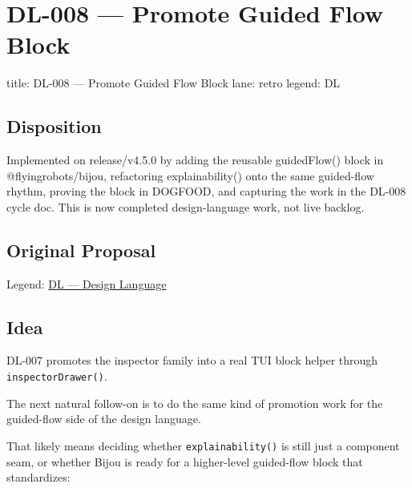 \chapter{DL-008 --- Promote Guided Flow Block}\label{record-301}

\smallskip

\begin{RecordMeta}
title: DL-008 — Promote Guided Flow Block
lane: retro
legend: DL

\end{RecordMeta}

\section{Disposition}\label{record-301-disposition}

Implemented on release/v4.5.0 by adding the reusable guidedFlow() block in @flyingrobots/bijou, refactoring explainability() onto the same guided-flow rhythm, proving the block in DOGFOOD, and capturing the work in the DL-008 cycle doc. This is now completed design-language work, not live backlog.

\section{Original Proposal}\label{record-301-original-proposal}

Legend: \href{https://github.com/flyingrobots/bijou/blob/1853ad902f6bf219326409e7f743a5a1d6517dbc/docs/method/legends/DL-design-language.md}{DL --- Design Language}

\section{Idea}\label{record-301-idea}

DL-007 promotes the inspector family into a real TUI block helper through \texttt{i\allowbreak{}n\allowbreak{}s\allowbreak{}p\allowbreak{}e\allowbreak{}c\allowbreak{}t\allowbreak{}o\allowbreak{}r\allowbreak{}D\allowbreak{}r\allowbreak{}a\allowbreak{}w\allowbreak{}e\allowbreak{}r\allowbreak{}(\allowbreak{})}.

The next natural follow-on is to do the same kind of promotion work for the guided-flow side of the design language.

That likely means deciding whether \texttt{e\allowbreak{}x\allowbreak{}p\allowbreak{}l\allowbreak{}a\allowbreak{}i\allowbreak{}n\allowbreak{}a\allowbreak{}b\allowbreak{}i\allowbreak{}l\allowbreak{}i\allowbreak{}t\allowbreak{}y\allowbreak{}(\allowbreak{})} is still just a component seam, or whether Bijou is ready for a higher-level guided-flow block that standardizes:

